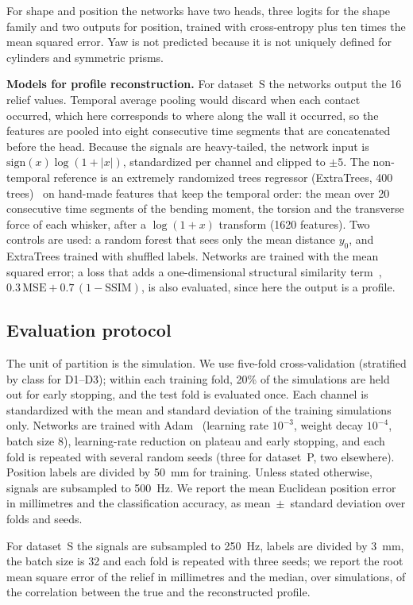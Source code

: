 \documentclass[conference]{IEEEtran}
\begin{document}
For shape and position the networks have two heads, three logits for the shape family and two outputs for position, trained with cross-entropy plus ten times the mean squared error. Yaw is not predicted because it is not uniquely defined for cylinders and symmetric prisms.

\textbf{Models for profile reconstruction.} For dataset~S the networks output the 16 relief values. Temporal average pooling would discard when each contact occurred, which here corresponds to where along the wall it occurred, so the features are pooled into eight consecutive time segments that are concatenated before the head. Because the signals are heavy-tailed, the network input is $\mathrm{sign}(x)\log(1+|x|)$, standardized per channel and clipped to $\pm5$. The non-temporal reference is an extremely randomized trees regressor (ExtraTrees, 400 trees)~\cite{geurts2006} on hand-made features that keep the temporal order: the mean over 20 consecutive time segments of the bending moment, the torsion and the transverse force of each whisker, after a $\log(1+x)$ transform (1620 features). Two controls are used: a random forest that sees only the mean distance $y_0$, and ExtraTrees trained with shuffled labels. Networks are trained with the mean squared error; a loss that adds a one-dimensional structural similarity term~\cite{wang2004}, $0.3\,\mathrm{MSE}+0.7\,(1-\mathrm{SSIM})$, is also evaluated, since here the output is a profile.

\subsection{Evaluation protocol}
The unit of partition is the simulation. We use five-fold cross-validation (stratified by class for D1--D3); within each training fold, 20\% of the simulations are held out for early stopping, and the test fold is evaluated once. Each channel is standardized with the mean and standard deviation of the training simulations only. Networks are trained with Adam~\cite{kingma2015} (learning rate $10^{-3}$, weight decay $10^{-4}$, batch size 8), learning-rate reduction on plateau and early stopping, and each fold is repeated with several random seeds (three for dataset~P, two elsewhere). Position labels are divided by 50~mm for training. Unless stated otherwise, signals are subsampled to 500~Hz. We report the mean Euclidean position error in millimetres and the classification accuracy, as mean~$\pm$~standard deviation over folds and seeds.

For dataset~S the signals are subsampled to 250~Hz, labels are divided by 3~mm, the batch size is 32 and each fold is repeated with three seeds; we report the root mean square error of the relief in millimetres and the median, over simulations, of the correlation between the true and the reconstructed profile.
\end{document}
